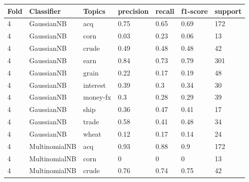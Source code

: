 \documentclass{article}
\begin{document}
\begin{table}[h]
\begin{tabular}{lllllll}
\textbf{Fold} & \textbf{Classifier}    & \textbf{Topics} & \textbf{precision} & \textbf{recall} & \textbf{f1-score} & \textbf{support} \\ \hline
4             & GaussianNB             & acq             & 0.75               & 0.65            & 0.69              & 172              \\
4             & GaussianNB             & corn            & 0.03               & 0.23            & 0.06              & 13               \\
4             & GaussianNB             & crude           & 0.49               & 0.48            & 0.48              & 42               \\
4             & GaussianNB             & earn            & 0.84               & 0.73            & 0.79              & 301              \\
4             & GaussianNB             & grain           & 0.22               & 0.17            & 0.19              & 48               \\
4             & GaussianNB             & interest        & 0.39               & 0.3             & 0.34              & 30               \\
4             & GaussianNB             & money-fx        & 0.3                & 0.28            & 0.29              & 39               \\
4             & GaussianNB             & ship            & 0.36               & 0.47            & 0.41              & 17               \\
4             & GaussianNB             & trade           & 0.58               & 0.41            & 0.48              & 34               \\
4             & GaussianNB             & wheat           & 0.12               & 0.17            & 0.14              & 24               \\
4             & MultinomialNB          & acq             & 0.93               & 0.88            & 0.9               & 172              \\
4             & MultinomialNB          & corn            & 0                  & 0               & 0                 & 13               \\
4             & MultinomialNB          & crude           & 0.76               & 0.74            & 0.75              & 42               \\

\end{tabular}
\end{table}
\end{document}
